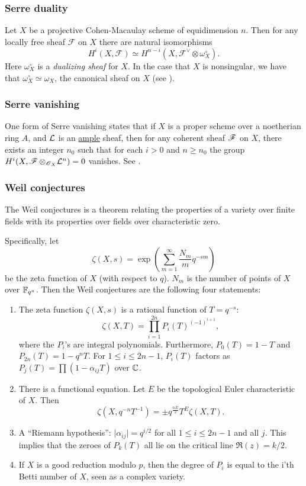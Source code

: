\documentclass[11pt, english]{article}
\begin{document}
\subsubsection{Serre duality}
\label{serreduality}

Let $X$ be a projective Cohen-Macaulay scheme of equidimension $n$. Then for any locally free sheaf $\mathcal F$ on $X$ there are natural isomorphisms
\[
H^i(X,\mathcal F) \simeq H^{n-i}(X, \mathcal F^\vee \otimes \omega_X^\circ).
\]
Here $\omega_X^\circ$ is a \emph{dualizing sheaf} for $X$. In the case that $X$ is nonsingular, we have that $\omega_X^\circ \simeq \omega_X$, the canonical sheaf on $X$ (see \cite[Chapter III, Corollary 7.12]{hartshorne}). 

\subsubsection{Serre vanishing}
\label{serrevanishing}

One form of Serre vanishing states that if $X$ is a proper scheme over a noetherian ring $A$, and $\mathcal{L}$ is an \hyperref[amplelinebundle]{ample} sheaf, then for any coherent sheaf $\operatorname{\mathscr{F}}$ on $X$, there exists an integer $n_0$ such that for each $i > 0$ and $n \geq n_0$ the group $H^i(X, \operatorname{\mathscr{F}} \otimes_{\operatorname{\mathscr{O}}_X} \mathcal{L}^n)=0$ vanishes. See \cite[Proposition III.5.3]{hartshorne}.

\subsubsection{Weil conjectures}
\label{weilconjectures}

The Weil conjectures is a theorem relating the properties of a variety over finite fields with its properties over fields over characteristic zero.

Specifically, let 
$$
\zeta(X,s) = \exp \left(\sum_{m=1}^\infty \frac{N_m}{m} q^{-sm}  \right)
$$
be the zeta function of $X$ (with respect to $q$). $N_m$ is the number of points of $X$ over $\mathbb{F}_{q^n}$. Then the Weil conjectures are the following four statements:
\begin{enumerate}
\item The zeta function $\zeta(X,s)$ is a rational function of $T=q^{-s}$:
$$
\zeta(X,T) = \prod_{i=1}^{2n} P_i(T)^{(-1)^{i+1}},
$$
where the $P_i$'s are integral polynomials. Furthermore, $P_0(T)=1-T$ and $P_{2n}(T) = 1-q^nT$. For $1 \leq i \leq 2n-1$, $P_i(T)$ factors as $P_j(T)=\prod (1-\alpha_{ij}T)$ over $\mathbb{C}$. 
\item There is a functional equation. Let $E$ be the topological Euler characteristic of $X$. Then
$$
\zeta(X,q^{-n} T^{-1}) = \pm q^{\frac {nE}{2}} T^E \zeta(X,T).
$$
\item A ``Riemann hypothesis'':  $\lvert \alpha_{ij} \rvert = q^{i/2}$ for all $1 \leq i \leq 2n-1$ and all $j$. This implies that the zeroes of $P_k(T)$ all lie on the critical line $\Re(z)=k/2$. 
\item If $X$ is a good reduction modulo $p$, then the degree of $P_i$ is equal to the i'th Betti number of $X$, seen as a complex variety.
\end{enumerate}
\end{document}
